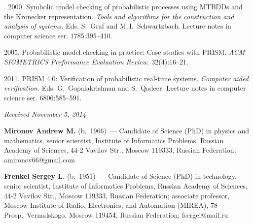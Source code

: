 \begin{multicols}{2}
{{\begin{thebibliography}{99}
.
2000.
Symbolic model
checking of probabilistic processes using MTBDDs and the Kronecker representation.
\textit{Tools and algorithms for the construction and analysis
of systems.} Eds. S.~Graf and M.\,I.~Schwartzbach.
Lecture notes in computer science ser.
1785:395--410.


2005.
Probabilistic model checking in practice:
Case studies with PRISM.
\textit{ACM SIGMETRICS Performance Evaluation Review.}
32(4):16--21.

2011.
PRISM 4.0: Verification of probabilistic real-time systems.
\textit{Computer aided verification.}  Eds. G.~Gopalakrishnan and S.~Qadeer.
Lecture notes in computer science ser.
6806:585--591.


\end{thebibliography}

 }
 }

\end{multicols}

\vspace*{-12pt}

\hfill{\small\textit{Received November 5, 2014}}

\pagebreak



\Contr


\noindent
\textbf{Mironov Andrew M.} (b.\ 1966)~---
Candidate of Science (PhD) in physics and mathematics,
senior scientist, Institute of Informatics Problems,
Russian Academy of Sciences, 44-2 Vavilov Str., Moscow 119333,
Russian Federation; amironov66@gmail.com

\vspace*{6pt}

\noindent
\textbf{Frenkel Sergey L.} (b.\ 1951)~---
Candidate of Science (PhD) in technology, senior scientist,
Institute of Informatics Problems, Russian Academy of Sciences,
44-2 Vavilov Str., Moscow 119333, Russian Federation;
associate professor, Moscow Institute of Radio, Electronics, and Automation
(MIREA), 78 Prosp.\ Vernadskogo, Moscow 119454, Russian Federation; fsergei@mail.ru

\label{end\stat}

\renewcommand{\bibname}{\protect\rm Литература}
